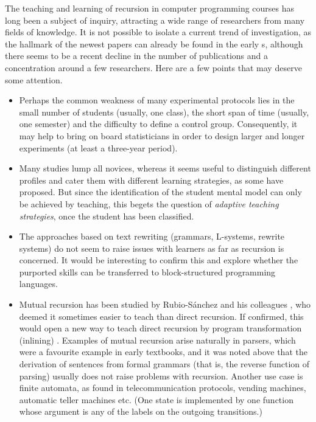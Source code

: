 \documentclass[11pt,a4paper]{article}
\begin{document}
The teaching and learning of recursion in computer programming courses
has long been a subject of inquiry, attracting a wide range of
researchers from many fields of knowledge. It is not possible to
isolate a current trend of investigation, as the hallmark of the
newest papers can already be found in the early s,
although there seems to be a recent decline in the number of
publications and a concentration around a few researchers. Here are a
few points that may deserve some attention.
\begin{itemize}

\item Perhaps the common weakness of many experimental protocols lies
  in the small number of students (usually, one class), the short span
  of time (usually, one semester) and the difficulty to define a
  control group. Consequently, it may help to bring on board
  statisticians in order to design larger and longer experiments (at
  least a three\hyp{}year period).

\item Many studies lump all novices, whereas it seems useful to
  distinguish different profiles and cater them with different
  learning strategies, as some have proposed. But since the
  identification of the student mental model can only be achieved by
  teaching, this begets the question of \emph{adaptive teaching
    strategies}, once the student has been classified.

\item The approaches based on text rewriting (grammars, L-systems,
  rewrite systems) do not seem to raise issues with learners as far as
  recursion is concerned. It would be interesting to confirm this and
  explore whether the purported skills can be transferred to
  block\hyp{}structured programming languages.

\item Mutual recursion has been studied by Rubio\hyp{}S\'anchez and
  his colleagues \citep{RubioPajak:2006,RubioUrquizaPareja:2008}, who
  deemed it sometimes easier to teach than direct recursion. If
  confirmed, this would open a new way to teach direct recursion by
  program transformation (inlining)
  \citep{KaserRamakrishnanPawagi:1993}. Examples of mutual recursion
  arise naturally in parsers, which were a favourite example in early
  textbooks, and it was noted above that the derivation of sentences
  from formal grammars (that is, the reverse function of parsing)
  usually does not raise problems with recursion. Another use case is
  finite automata, as found in telecommunication protocols, vending
  machines, automatic teller machines etc. (One state is implemented
  by one function whose argument is any of the labels on the
  outgoing transitions.)


\end{itemize}
\end{document}
